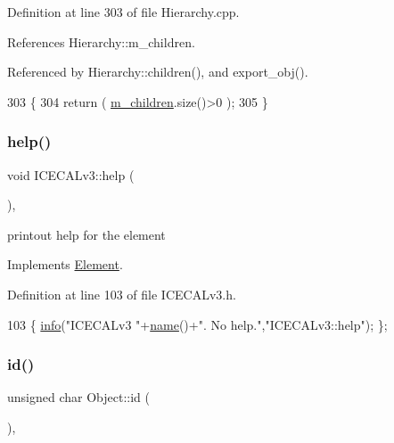 Definition at line 303 of file Hierarchy.\+cpp.



References Hierarchy\+::m\+\_\+children.



Referenced by Hierarchy\+::children(), and export\+\_\+obj().


\begin{DoxyCode}
303                               \{
304   \textcolor{keywordflow}{return} ( \hyperlink{classHierarchy_a038816763941fd4a930504917f60483b}{m\_children}.size()>0 );
305 \}
\end{DoxyCode}
\mbox{\label{classICECALv3_a00e572849b4952e7cf04a39f992df037}} 
\subsubsection{\texorpdfstring{help()}{help()}}
{\footnotesize\ttfamily void I\+C\+E\+C\+A\+Lv3\+::help (\begin{DoxyParamCaption}{ }\end{DoxyParamCaption})\hspace{0.3cm}{\ttfamily [inline]}, {\ttfamily [virtual]}}

printout help for the element 

Implements \hyperlink{classElement_a32c0de27acb08e17251cef88c3e9303a}{Element}.



Definition at line 103 of file I\+C\+E\+C\+A\+Lv3.\+h.


\begin{DoxyCode}
103 \{ \hyperlink{classObject_a644fd329ea4cb85f54fa6846484b84a8}{info}(\textcolor{stringliteral}{"ICECALv3 "}+\hyperlink{classObject_a300f4c05dd468c7bb8b3c968868443c1}{name}()+\textcolor{stringliteral}{". No help."},\textcolor{stringliteral}{"ICECALv3::help"}); \};
\end{DoxyCode}
\mbox{\label{classObject_af99145335cc61ff6e2798ea17db009d2}} 
\subsubsection{\texorpdfstring{id()}{id()}}
{\footnotesize\ttfamily unsigned char Object\+::id (\begin{DoxyParamCaption}{ }\end{DoxyParamCaption})\hspace{0.3cm}{\ttfamily [inline]}, {\ttfamily [inherited]}}



